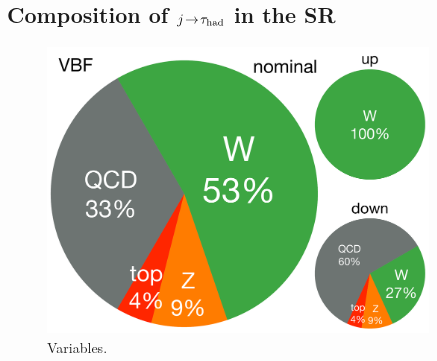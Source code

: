 \subsection{Composition of $j\!\rightarrow\!\tau_\text{had}$ in the SR}

\begin{figure}[tp]
  \centering
  \includegraphics[width=0.90\textwidth]{figures/backgrounds/rx-vbf}
  \caption{Variables.}
  \label{fig:backgrounds-rx-vbf}
\end{figure}

\clearpage

